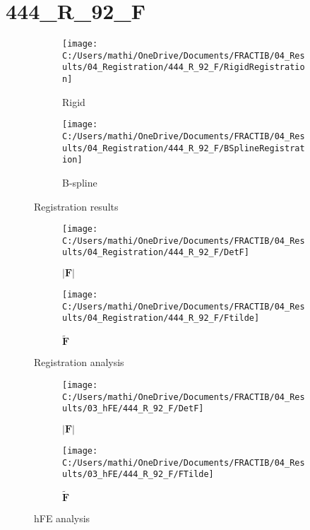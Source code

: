 \documentclass{article}%
\begin{document}
%
\newpage%
\section*{444\_R\_92\_F}%
\label{sec:444R92F}%


\begin{figure}[h!]%
\begin{subfigure}[b]{0.5\linewidth}%
\texttt{[image: C:/Users/mathi/OneDrive/Documents/FRACTIB/04\_Results/04\_Registration/444\_R\_92\_F/RigidRegistration]}%
\caption{Rigid}%
\end{subfigure}%
\begin{subfigure}[b]{0.5\linewidth}%
\texttt{[image: C:/Users/mathi/OneDrive/Documents/FRACTIB/04\_Results/04\_Registration/444\_R\_92\_F/BSplineRegistration]}%
\caption{B{-}spline}%
\end{subfigure}%
\caption{Registration results}%
\end{figure}

%


\begin{figure}[h!]%
\begin{subfigure}[b]{0.5\linewidth}%
\texttt{[image: C:/Users/mathi/OneDrive/Documents/FRACTIB/04\_Results/04\_Registration/444\_R\_92\_F/DetF]}%
\caption{$|\mathbf{F}|$}%
\end{subfigure}%
\begin{subfigure}[b]{0.5\linewidth}%
\texttt{[image: C:/Users/mathi/OneDrive/Documents/FRACTIB/04\_Results/04\_Registration/444\_R\_92\_F/Ftilde]}%
\caption{$\tilde{\mathbf{F}}$}%
\end{subfigure}%
\caption{Registration analysis}%
\end{figure}

%


\begin{figure}[h!]%
\begin{subfigure}[b]{0.5\linewidth}%
\texttt{[image: C:/Users/mathi/OneDrive/Documents/FRACTIB/04\_Results/03\_hFE/444\_R\_92\_F/DetF]}%
\caption{$|\mathbf{F}|$}%
\end{subfigure}%
\begin{subfigure}[b]{0.5\linewidth}%
\texttt{[image: C:/Users/mathi/OneDrive/Documents/FRACTIB/04\_Results/03\_hFE/444\_R\_92\_F/FTilde]}%
\caption{$\tilde{\mathbf{F}}$}%
\end{subfigure}%
\caption{hFE analysis}%
\end{figure}
\end{document}
